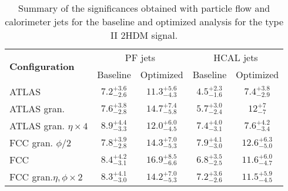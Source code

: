 \begin{table}[h]
	\caption{Summary of the significances obtained with particle flow and calorimeter jets for the baseline and optimized analysis for the type II 2HDM signal.}
	\label{table:sum_2HDM}
	\centering
	\begin{tabular}{lcccc}
		\hline
		\multirow{2}{*}{\textbf{Configuration}} & \multicolumn{2}{c}{PF jets}    & \multicolumn{2}{c}{HCAL jets} \\ \cline{2-5} 
		& Baseline & Optimized & Baseline  & Optimized           \\ \midrule \midrule
		ATLAS& $7.2^{+3.6}_{-2.6}$ & $11.3^{+5.6}_{-4.3}$ & $4.5^{+2.3}_{-1.6}$ & $7.4^{+3.8}_{-2.9}$          \\ 
		\rowcolor{black!7}ATLAS gran.& $7.6^{+3.8}_{-2.8}$ & $14.7^{+7.4}_{-5.8}$ & $5.7^{+3.0}_{-2.4}$ & $12^{+7}_{-7}$ \\ 
		ATLAS gran. $\eta\times 4$& $8.9^{+4.4}_{-3.3}$ & $12.0^{+6.0}_{-4.5}$ &$7.4^{+4.0}_{-3.1}$ & $7.6^{+4.2}_{-3.4}$          \\ 
		\rowcolor{black!7}FCC gran. $\phi/2$& $7.8^{+3.9}_{-2.8}$ & $14.3^{+7.0}_{-5.3}$ &$7.9^{+4.1}_{-3.0}$  & $12.6^{+6.3}_{-5.0}$  \\ 
		FCC& $8.4^{+4.2}_{-3.1}$ & $16.9^{+8.5}_{-6.6}$ & $6.8^{+3.5}_{-2.5}$ & $11.6^{+6.0}_{-4.7}$\\ 
		\rowcolor{black!7}FCC gran.$\eta,\phi \times 2$& $8.3^{+4.1}_{-3.0}$ & $14.2^{+7.0}_{-5.3}$ & $7.2^{+3.6}_{-2.6}$ & $11.5^{+5.9}_{-4.5}$\\ \bottomrule
	\end{tabular}
	
\end{table}

